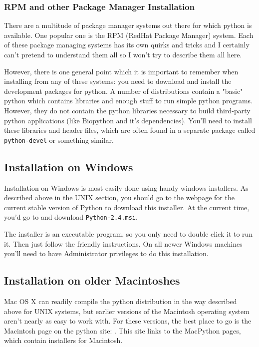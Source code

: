 \documentclass{article}
\begin{document}
\subsubsection{RPM and other Package Manager Installation}

There are a multitude of package manager systems out there for which
python is available. One popular one is the RPM (RedHat Package Manager)
system. Each of these package managing systems has its own quirks and
tricks and I certainly can't pretend to understand them all so I won't
try to describe them all here.


However, there is one general point which it is important to remember
when installing from any of these systems: you need to download and
install the development packages for python. A number of distributions
contain a "basic" python which contains libraries and enough stuff to
run simple python programs. However, they do not contain the python
libraries necessary to build third-party python applications (like
Biopython and it's dependencies). You'll need to install these libraries
and header files, which are often found in a separate package called
\verb|python-devel| or something similar. 

\subsection{Installation on Windows} 

Installation on Windows is most easily done using handy windows
installers. As described above in the UNIX section, you should go to the
webpage for the current stable version of Python to download this
installer. At the current time, you'd go to
 and download
\verb|Python-2.4.msi|. 


The installer is an executable program, so you only need to double click
it to run it. Then just follow the friendly instructions. On all newer Windows
machines you'll need to have Administrator privileges to do this
installation.

\subsection{Installation on older Macintoshes}

Mac OS X can readily compile the python distribution in the way
described above for UNIX systems, but earlier versions of the Macintosh
operating system aren't nearly as easy to work with. For these versions,
the best place to go is the Macintosh page on the python site:
. This
site links to the MacPython pages, which contain installers for
Macintosh.
\end{document}
